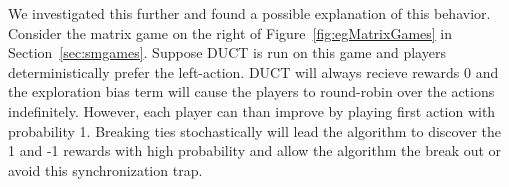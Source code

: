 We investigated this further and found a possible
explanation of this behavior. Consider the matrix game on the right of Figure~\ref{fig:egMatrixGames} in Section~\ref{sec:smgames}.
Suppose DUCT is run on this game and players deterministically prefer the left-action. 
DUCT will always recieve rewards 0 and the exploration bias term will cause the players to round-robin over the actions indefinitely. 
However, each player can than improve by playing first action with probability 1. Breaking ties stochastically will lead the algorithm to 
discover the 1 and -1 rewards with high probability and allow the algorithm the break out or avoid this synchronization trap.





